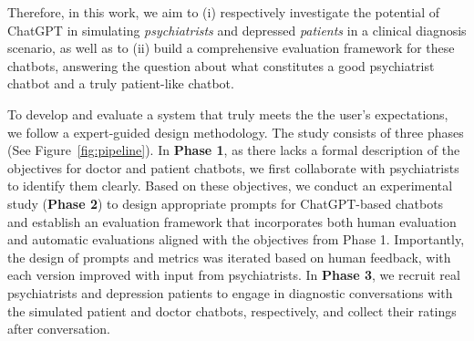 

Therefore, in this work, we aim to (i) respectively investigate the potential of ChatGPT in simulating \textit{psychiatrists} and depressed \textit{patients} in a clinical diagnosis scenario, 
as well as to (ii) build a comprehensive evaluation framework for these chatbots, answering the question about what constitutes a good psychiatrist chatbot and a truly patient-like chatbot.

To develop and evaluate a system that truly meets the the user's expectations, 
we follow a expert-guided design methodology. The study consists of three 
phases (See Figure~\ref{fig:pipeline}).
In \textbf{Phase 1}, as there lacks a formal description of the objectives for 
doctor and patient chatbots, we first collaborate with psychiatrists to 
identify them clearly. 
Based on these objectives, we conduct an experimental study 
(\textbf{Phase 2}) to design appropriate prompts for ChatGPT-based chatbots 
and establish an evaluation framework that incorporates both human evaluation 
and automatic evaluations aligned with the objectives from Phase 1. Importantly, the design of prompts and metrics was iterated based on human feedback, with each version improved with input from psychiatrists.
In \textbf{Phase 3}, we recruit real psychiatrists and depression patients to 
engage in diagnostic conversations with the 
simulated patient and doctor chatbots, respectively, and collect their 
ratings after conversation.

